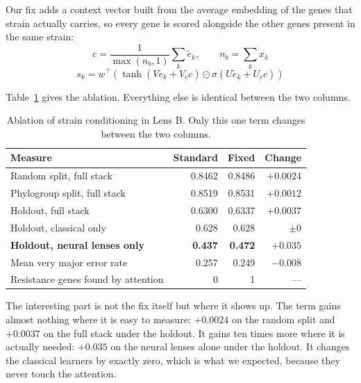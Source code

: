 \documentclass[conference]{IEEEtran}
\begin{document}
Our fix adds a context vector built from the average embedding of the genes that
strain actually carries, so every gene is scored alongside the other genes present
in the same strain:
\begin{equation}
c = \frac{1}{\max(n_b,1)}\sum_{k} \tilde{e}_k, \qquad n_b = \sum_k x_k
\end{equation}
\begin{equation}
s_k = w^{\!\top}\!\left( \tanh(V\tilde{e}_k + V_c c) \odot \sigma(U\tilde{e}_k + U_c c)\right)
\end{equation}

Table~\ref{tab:attnfix} gives the ablation. Everything else is identical between
the two columns.

\begin{table}[t]
\caption{Ablation of strain conditioning in Lens B. Only this one term changes
between the two columns.}
\label{tab:attnfix}
\centering
\small
\setlength{\tabcolsep}{4pt}
\renewcommand{\arraystretch}{1.15}
\begin{tabular}{|>{\raggedright\arraybackslash}p{3.6cm}|r|r|r|}
\hline
\rowcolor{headgrey}
\textbf{Measure} & \textbf{Standard} & \textbf{Fixed} & \textbf{Change} \\ \hline
Random split, full stack & 0.8462 & 0.8486 & $+0.0024$ \\ \hline
Phylogroup split, full stack & 0.8519 & 0.8531 & $+0.0012$ \\ \hline
Holdout, full stack & 0.6300 & 0.6337 & $+0.0037$ \\ \hline
Holdout, classical only & 0.628 & 0.628 & $\pm0$ \\ \hline
\rowcolor{oursblue}
\textbf{Holdout, neural lenses only} & \textbf{0.437} & \textbf{0.472} & $\mathbf{+0.035}$ \\ \hline\hline
Mean very major error rate & 0.257 & 0.249 & $-0.008$ \\ \hline
Resistance genes found by attention & 0 & 1 & --- \\ \hline
\end{tabular}
\renewcommand{\arraystretch}{1.0}
\end{table}

The interesting part is not the fix itself but where it shows up. The term gains
almost nothing where it is easy to measure: $+0.0024$ on the random split and
$+0.0037$ on the full stack under the holdout. It gains ten times more where it is
actually needed: $+0.035$ on the neural lenses alone under the holdout. It changes
the classical learners by exactly zero, which is what we expected, because they
never touch the attention.
\end{document}
